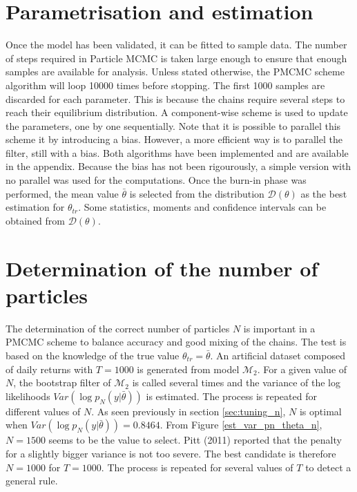 \documentclass[11pt,a4,twosided,singlespacing,titlepagenumber=on]{scrreprt}
\numberwithin{equation}{chapter} %
\theoremstyle{remark}
\begin{document}
\section{Parametrisation and estimation}

Once the model has been validated, it can be fitted to sample data. The number of steps required in Particle MCMC is taken large enough to ensure that enough samples are available for analysis. Unless stated otherwise, the PMCMC scheme algorithm will loop 10000 times before stopping. The first 1000 samples are discarded for each parameter. This is because the chains require several steps to reach their equilibrium distribution. A component-wise scheme is used to update the parameters, one by one sequentially. Note that it is possible to parallel this scheme it by introducing a bias. However, a more efficient way is to parallel the filter, still with a bias. Both algorithms have been implemented and are available in the appendix. Because the bias has not been rigourously, a simple version with no parallel was used for the computations. Once the burn-in phase was performed, the mean value $\bar{\theta}$ is selected from the distribution $\mathcal{D}(\theta)$ as the best estimation for $\theta_{tr}$. Some statistics, moments and confidence intervals can be obtained from $\mathcal{D}(\theta)$.

\section{Determination of the number of particles}
The determination of the correct number of particles $N$ is important in a PMCMC scheme to balance accuracy and good mixing of the chains. The test is based on the knowledge of the true value $\theta_{tr} = \bar{\theta}$. An artificial dataset composed of daily returns with $T=1000$ is generated from model $\mathcal{M}_2$. For a given value of $N$, the bootstrap filter of $\mathcal{M}_2$ is called several times and the variance of the log likelihoods $Var(\log p_N(y|\bar{\theta}))$ is estimated. The process is repeated for different values of $N$. As seen previously in section \ref{sec:tuning_n}, $N$ is optimal when $Var(\log p_N(y|\bar{\theta})) = 0.8464$. From Figure \ref{est_var_pn_theta_n}, $N = 1500$ seems to be the value to select. Pitt (2011) reported that the penalty for a slightly bigger variance is not too severe. The best candidate is therefore $N = 1000$ for $T=1000$. The process is repeated for several values of $T$ to detect a general rule.
\end{document}
